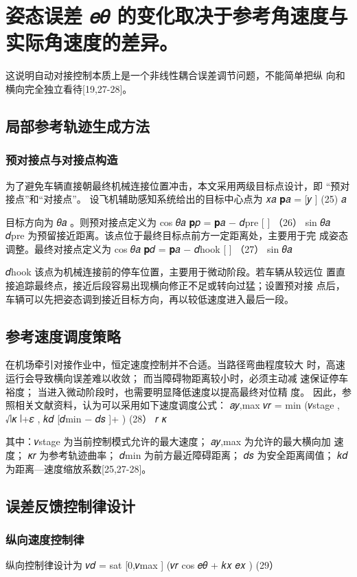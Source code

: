 \section{姿态误差 𝑒𝜃 的变化取决于参考角速度与实际角速度的差异。}
这说明自动对接控制本质上是一个非线性耦合误差调节问题，不能简单把纵
向和横向完全独立看待[19,27-28]。
\subsection{局部参考轨迹生成方法}
\subsubsection{预对接点与对接点构造}
为了避免车辆直接朝最终机械连接位置冲击，本文采用两级目标点设计，即
“预对接点”和“对接点”。
设飞机辅助感知系统给出的目标中心点为
𝑥𝑎
𝐩𝑎 = [𝑦 ]                (25)
𝑎

目标方向为 𝜃𝑎 。则预对接点定义为
cos 𝜃𝑎
𝐩𝑝 = 𝐩𝑎 − 𝑑pre [          ]    （26）
sin 𝜃𝑎
𝑑pre 为预留接近距离。该点位于最终目标点前方一定距离处，主要用于完
成姿态调整。最终对接点定义为
cos 𝜃𝑎
𝐩𝑑 = 𝐩𝑎 − 𝑑hook [          ]   （27）
sin 𝜃𝑎








𝑑hook 该点为机械连接前的停车位置，主要用于微动阶段。若车辆从较远位
置直接追踪最终点，接近后段容易出现横向修正不足或转向过猛；设置预对接
点后，车辆可以先把姿态调到接近目标方向，再以较低速度进入最后一段。
\subsection{参考速度调度策略}
在机场牵引对接作业中，恒定速度控制并不合适。当路径弯曲程度较大
时，高速运行会导致横向误差难以收敛； 而当障碍物距离较小时，必须主动减
速保证停车裕度； 当进入微动阶段时，也需要明显降低速度以提高最终对位精
度。 因此，参照相关文献资料，认为可以采用如下速度调度公式：
𝑎𝑦,max
𝑣𝑟 = min (𝑣stage , √∣𝜅 ∣+𝜀 , 𝑘𝑑 [𝑑min − 𝑑𝑠 ]+ )       (28）
𝑟   𝜅


其中：𝑣stage 为当前控制模式允许的最大速度； 𝑎𝑦,max 为允许的最大横向加
速度； 𝜅𝑟 为参考轨迹曲率； 𝑑min 为前方最近障碍距离； 𝑑𝑠 为安全距离阈值；
𝑘𝑑 为距离—速度缩放系数[25,27-28]。
\subsection{误差反馈控制律设计}
\subsubsection{纵向速度控制律}
纵向控制律设计为
𝑣𝑑 = sat [0,𝑣max ] (𝑣𝑟 cos 𝑒𝜃 + 𝑘𝑥 𝑒𝑥 )           (29）

